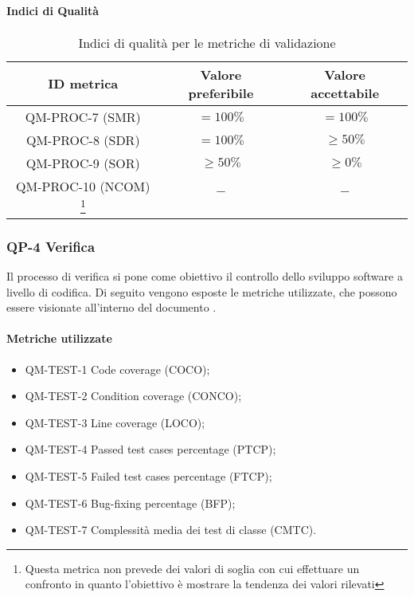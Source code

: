 		\paragraph{Indici di Qualità}

			\begin{center}
				\begin{longtable}{|c|c|c|}
				\hline
				\rowcolor{lighter-grayer}
				\textbf{ID metrica} & \textbf{Valore preferibile} & \textbf{Valore accettabile}\\
				\hline
				\endfirsthead
				\hline
				QM-PROC-7 (SMR) & \(= 100\%\) & \(= 100\%\) \\
				\hline
				QM-PROC-8 (SDR) & \(= 100\%\) & \(\geq 50\%\) \\
				\hline
				QM-PROC-9 (SOR) & \(\geq 50\%\) & \(\geq 0\%\) \\
				\hline
				QM-PROC-10 (NCOM) \footnote{Questa metrica non prevede dei valori di soglia con cui effettuare un confronto in quanto l'obiettivo è mostrare la tendenza dei valori rilevati} & \(-\) & \(-\) \\
				\hline
				\caption{Indici di qualità per le metriche di validazione}
				\end{longtable}
			\end{center}
	\newpage
	\subsubsection{QP-4 Verifica}

		Il processo di verifica si pone come obiettivo il controllo dello sviluppo software a livello di codifica.
		\newline
		Di seguito vengono esposte le metriche utilizzate, che possono essere visionate all'interno del documento .

		\paragraph{Metriche utilizzate}

			\begin{itemize}
				\item QM-TEST-1 Code coverage (COCO);
				\item QM-TEST-2 Condition coverage (CONCO);
				\item QM-TEST-3 Line coverage (LOCO);
				\item QM-TEST-4 Passed test cases percentage (PTCP);
				\item QM-TEST-5 Failed test cases percentage (FTCP);
				\item QM-TEST-6 Bug-fixing percentage (BFP);
				\item QM-TEST-7 Complessità media dei test di classe (CMTC).
			\end{itemize}



